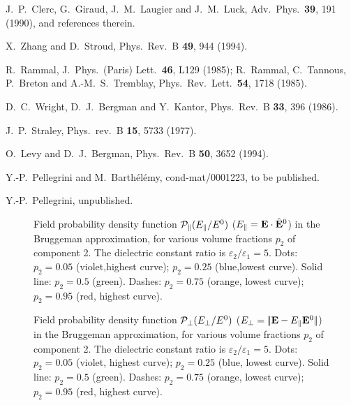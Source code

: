 \begin{thebibliography}{99}
 J.\ P.\ Clerc, G.\ Giraud, J.\ M.\ Laugier 
and J.\ M.\ Luck, Adv.\ Phys.\ {\bf 39}, 191 (1990), 
and references therein.

 X.\ Zhang and D.\ Stroud, 
Phys.\ Rev.\ B {\bf 49}, 944 (1994). 

 R.\ Rammal, J.\ Phys.\ (Paris) Lett.\ {\bf 46}, L129 (1985); 
R.\ Rammal, C.\ Tannous, P.\ Breton and A.-M.\ S.\ Tremblay, 
Phys.\ Rev.\ Lett.\ {\bf 54}, 1718 (1985).

 D.\ C.\ Wright, D.\ J.\ Bergman and Y.\ Kantor, 
Phys.\ Rev.\ B {\bf 33}, 396 (1986).

 J.\ P.\ Straley, 
Phys.\ rev.\ B {\bf 15}, 5733 (1977).

 O.\ Levy and D.\ J.\ Bergman, 
Phys.\ Rev.\ B {\bf 50}, 3652 (1994). 

 Y.-P.\ Pellegrini and M.\ Barth\'el\'emy, cond-mat/0001223, to be published. 

 Y.-P.\ Pellegrini, unpublished.

\end{thebibliography}


\twocolumn
\begin{figure}
\narrowtext
\vspace*{0.0cm}
\centerline{
}
\vspace*{0.0cm}
\caption{Field probability density function 
${\cal P}_\parallel(E_\parallel/E^0)$ 
($E_\parallel={\bf E}\cdot\hat{\bf E}^0$) in the 
Bruggeman approximation, for various volume fractions 
$p_2$ of component 2. The dielectric constant ratio is 
$\varepsilon_2/\varepsilon_1=5$. Dots: $p_2=0.05$ 
(violet,highest curve); $p_2=0.25$ (blue,lowest curve). 
Solid line: $p_2=0.5$ (green). Dashes: $p_2=0.75$ 
(orange, lowest curve); $p_2=0.95$ (red, highest curve).
}
\label{fig1}
\end{figure}

\begin{figure}
\narrowtext
\vspace*{0.0cm}
\centerline{
}
\vspace*{0.0cm}
\caption{Field probability density function 
${\cal P}_\perp(E_\perp/E^0)$ 
($E_\perp=|\!|{\bf E}-E_\parallel{\bf E}^0|\!|$) 
in the Bruggeman approximation, for various volume 
fractions $p_2$ of component 2. The dielectric 
constant ratio is $\varepsilon_2/\varepsilon_1=5$. 
Dots: $p_2=0.05$ (violet, highest curve); $p_2=0.25$ 
(blue, lowest curve). Solid line: $p_2=0.5$ (green). Dashes: 
$p_2=0.75$ (orange, lowest curve); $p_2=0.95$ (red, highest curve).
}
\label{fig2}
\end{figure}

